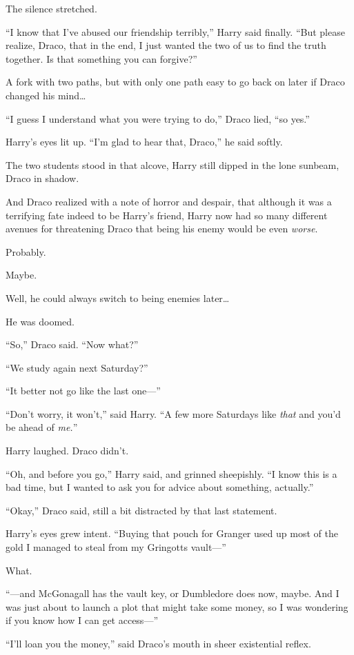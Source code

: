The silence stretched.

“I know that I’ve abused our friendship terribly,” Harry said finally. “But please realize, Draco, that in the end, I just wanted the two of us to find the truth together. Is that something you can forgive?”

A fork with two paths, but with only one path easy to go back on later if Draco changed his mind…

“I guess I understand what you were trying to do,” Draco lied, “so yes.”

Harry’s eyes lit up. “I’m glad to hear that, Draco,” he said softly.

The two students stood in that alcove, Harry still dipped in the lone sunbeam, Draco in shadow.

And Draco realized with a note of horror and despair, that although it was a terrifying fate indeed to be Harry’s friend, Harry now had so many different avenues for threatening Draco that being his enemy would be even \emph{worse}.

Probably.

Maybe.

Well, he could always switch to being enemies later…

He was doomed.

“So,” Draco said. “Now what?”

“We study again next Saturday?”

“It better not go like the last one—”

“Don’t worry, it won’t,” said Harry. “A few more Saturdays like \emph{that} and you’d be ahead of \emph{me.}”

Harry laughed. Draco didn’t.

“Oh, and before you go,” Harry said, and grinned sheepishly. “I know this is a bad time, but I wanted to ask you for advice about something, actually.”

“Okay,” Draco said, still a bit distracted by that last statement.

Harry’s eyes grew intent. “Buying that pouch for Granger used up most of the gold I managed to steal from my Gringotts vault—”

What.

“—and McGonagall has the vault key, or Dumbledore does now, maybe. And I was just about to launch a plot that might take some money, so I was wondering if you know how I can get access—”

“I’ll loan you the money,” said Draco’s mouth in sheer existential reflex.

